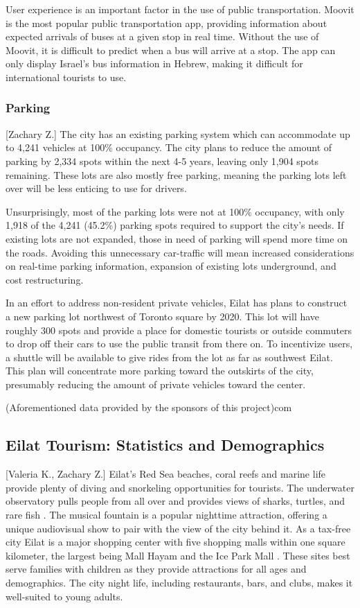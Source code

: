 \documentclass[12pt]{article}                               %
\begin{document}
User experience is an important factor in the use of public transportation. Moovit is the most popular public transportation app, providing information about expected arrivals of buses at a given stop in real time. Without the use of Moovit, it is difficult to predict when a bus will arrive at a stop. The app can only display Israel's bus information in Hebrew, making it difficult for international tourists to use.


\subsubsection{Parking}[Zachary Z.] \label{sec:parking}
The city has an existing parking system which can accommodate up to 4,241 vehicles at 100\% occupancy. The city plans to reduce the amount of parking by 2,334 spots within the next 4-5 years, leaving only 1,904 spots remaining. These lots are also mostly free parking, meaning the parking lots left over will be less enticing to use for drivers. 

Unsurprisingly, most of the parking lots were not at 100\% occupancy, with only 1,918 of the 4,241 (45.2\%) parking spots required to support the city's needs. If existing lots are not expanded, those in need of parking will spend more time on the roads. Avoiding this unnecessary car-traffic will mean increased considerations on real-time parking information, expansion of existing lots underground, and cost restructuring. 

In an effort to address non-resident private vehicles, Eilat has plans to construct a new parking lot northwest of Toronto square by 2020. This lot will have roughly 300 spots and provide a place for domestic tourists or outside commuters to drop off their cars to use the public transit from there on. To incentivize users, a shuttle will be available to give rides from the lot as far as southwest Eilat. This plan will concentrate more parking toward the outskirts of the city, presumably reducing the amount of private vehicles toward the center. 

(Aforementioned data provided by the sponsors of this project)com

\subsection{Eilat Tourism: Statistics and Demographics}[Valeria K., Zachary Z.]
Eilat's Red Sea beaches, coral reefs and marine life provide plenty of diving and snorkeling opportunities for tourists. The underwater observatory pulls people from all over and provides views of sharks, turtles, and rare fish \cite{Benner2017}. The musical fountain is a popular nighttime attraction, offering a unique audiovisual show to pair with the view of the city behind it. As a tax-free city Eilat is a major shopping center with five shopping malls within one square kilometer, the largest being Mall Hayam and the Ice Park Mall \cite{Benner2017}. These sites best serve families with children as they provide attractions for all ages and demographics. The city night life, including restaurants, bars, and clubs, makes it well-suited to young adults.
\end{document}
